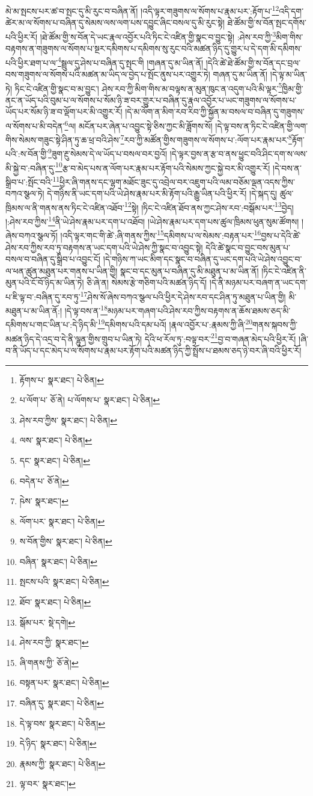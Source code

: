 མེ་མ་སྤངས་པར་ཚ་བ་སྤང་དུ་མི་རུང་བ་བཞིན་ནོ། །འདི་ལྟར་གཟུགས་ལ་སོགས་པ་རྣམ་པར་:རྟོག་པ་\footnote{རྟོགས་པ་  སྣར་ཐང་།  པེ་ཅིན། }\footnote{པ་ལོག་པ་  ཅོ་ནེ། པ་ལོགས་པ་  སྣར་ཐང་།  པེ་ཅིན། }འདི་དག་ཚེར་མ་ལ་སོགས་པ་བཞིན་དུ་སེམས་ལས་ལག་པས་དབྱུང་ཞིང་བསལ་དུ་མི་རུང་སྟེ། ཐེ་ཚོམ་གྱི་ས་བོན་སྤང་དགོས་པའི་ཕྱིར་རོ། །ཐེ་ཚོམ་གྱི་ས་བོན་དེ་ཡང་རྣལ་འབྱོར་པའི་ཏིང་ངེ་འཛིན་གྱི་སྣང་བ་བྱུང་སྟེ། :ཤེས་རབ་ཀྱི་\footnote{ཤེས་རབ་ཀྱིས་  སྣར་ཐང་།  པེ་ཅིན། }མིག་གིས་བརྟགས་ན་གཟུགས་ལ་སོགས་པ་སྔར་དམིགས་པ་དམིགས་སུ་རུང་བའི་མཚན་ཉིད་དུ་གྱུར་པ་དེ་དག་མི་དམིགས་པའི་ཕྱིར་ཐག་པ་ལ་\footnote{ལས་  སྣར་ཐང་།  པེ་ཅིན། }སྦྲུལ་དུ་ཤེས་པ་བཞིན་དུ་སྤང་གི །གཞན་དུ་མ་ཡིན་ནོ། །དེའི་ཚེ་ཐེ་ཚོམ་གྱི་ས་བོན་དང་བྲལ་བས་གཟུགས་ལ་སོགས་པའི་མཚན་མ་ཡིད་ལ་བྱེད་པ་སྤོང་ནུས་པར་འགྱུར་ཏེ། གཞན་དུ་མ་ཡིན་ནོ། །དེ་ལྟ་མ་ཡིན་ཏེ། ཏིང་ངེ་འཛིན་གྱི་སྣང་བ་མ་བྱུང་། ཤེས་རབ་ཀྱི་མིག་གིས་མ་བལྟས་ན་མུན་ཁུང་ན་འདུག་པའི་མི་ལྟར་\footnote{དང་  སྣར་ཐང་།  པེ་ཅིན། }ཁྱིམ་གྱི་ནང་ན་ཡོད་པའི་བུམ་པ་ལ་སོགས་པ་སོམ་ཉི་ཟ་བར་གྱུར་པ་བཞིན་དུ་རྣལ་འབྱོར་པ་ཡང་གཟུགས་ལ་སོགས་པ་ཡོད་པར་སོམ་ཉི་ཟ་བ་ལྡོག་པར་མི་འགྱུར་རོ། །དེ་མ་ལོག་ན་མིག་རབ་རིབ་ཀྱི་སྐྱོན་མ་བསལ་བ་བཞིན་དུ་གཟུགས་ལ་སོགས་པ་མི་བདེན་\footnote{བདེན་པ་  ཅོ་ནེ། }ལ། མངོན་པར་ཞེན་པ་འབྱུང་སྟེ་ཅིས་ཀྱང་མི་ཟློགས་སོ། །དེ་ལྟ་བས་ན་ཏིང་ངེ་འཛིན་གྱི་ལག་གིས་སེམས་གཟུང་སྟེ་ཤིན་ཏུ་ཆ་ཕྲ་བའི་ཤེས་\footnote{ཥེས་  སྣར་ཐང་། }རབ་ཀྱི་མཚོན་གྱིས་གཟུགས་ལ་སོགས་པ་:ལོག་པར་རྣམ་པར་\footnote{ལོག་པར་  སྣར་ཐང་།  པེ་ཅིན། }རྟོག་པའི་:ས་བོན་གྱི་\footnote{ས་བོན་གྱིས་  སྣར་ཐང་།  པེ་ཅིན། }ཟུག་རྔུ་སེམས་དེ་ལ་ཡོད་པ་བསལ་བར་བྱའོ། །དེ་ལྟར་བྱས་ན་རྩ་བ་ནས་ཕྱུང་བའི་ཤིང་དག་ས་ལས་མི་སྐྱེ་བ་:བཞིན་དུ་\footnote{བཞིན་  སྣར་ཐང་།  པེ་ཅིན། }རྩ་བ་མེད་པས་ན་ལོག་པར་རྣམ་པར་རྟོག་པའི་སེམས་ཀྱང་སྐྱེ་བར་མི་འགྱུར་རོ། །དེ་བས་ན་སྒྲིབ་པ་:སྤོང་བའི་\footnote{སྤངས་པའི་  སྣར་ཐང་།  པེ་ཅིན། }ཕྱིར་ཞི་གནས་དང་ལྷག་མཐོང་ཟུང་དུ་འབྲེལ་བར་འཇུག་པའི་ལམ་བཅོམ་ལྡན་འདས་ཀྱིས་བཀའ་སྩལ་ཏེ། དེ་གཉིས་ནི་ཡང་དག་པའི་ཡེ་ཤེས་རྣམ་པར་མི་རྟོག་པའི་རྒྱུ་ཡིན་པའི་ཕྱིར་རོ། །དེ་སྐད་དུ། ཚུལ་ཁྲིམས་ལ་ནི་གནས་ནས་ཏིང་ངེ་འཛིན་འཐོབ་\footnote{ཐོབ་  སྣར་ཐང་།  པེ་ཅིན། }སྟེ། །ཏིང་ངེ་འཛིན་ཐོབ་ནས་ཀྱང་ཤེས་རབ་:བསྒོམ་པར་\footnote{སྒོམ་པར་  སྡེ་དགེ། }བྱེད། །:ཤེས་རབ་ཀྱིས་\footnote{ཤེས་རབ་ཀྱི་  སྣར་ཐང་། }ནི་ཡེ་ཤེས་རྣམ་པར་དག་པ་འཐོབ། །ཡེ་ཤེས་རྣམ་པར་དག་པས་ཚུལ་ཁྲིམས་ཕུན་སུམ་ཚོགས། །ཞེས་བཀའ་སྩལ་ཏོ། །འདི་ལྟར་གང་གི་ཚེ་:ཞི་གནས་ཀྱིས་\footnote{ཞི་གནས་ཀྱི་  ཅོ་ནེ། }དམིགས་པ་ལ་སེམས་:བརྟན་པར་\footnote{བསྟན་པར་  སྣར་ཐང་།  པེ་ཅིན། }བྱས་པ་དེའི་ཚེ་ཤེས་རབ་ཀྱིས་རབ་ཏུ་བརྟགས་ན་ཡང་དག་པའི་ཡེ་ཤེས་ཀྱི་སྣང་བ་འབྱུང་སྟེ། དེའི་ཚེ་སྣང་བ་བྱུང་བས་མུན་པ་བསལ་བ་བཞིན་དུ་སྒྲིབ་པ་འབྱུང་ངོ། །དེ་གཉིས་ཀ་ཡང་མིག་དང་སྣང་བ་བཞིན་དུ་ཡང་དག་པའི་ཡེ་ཤེས་འབྱུང་བ་ལ་ཕན་ཚུན་མཐུན་པར་གནས་པ་ཡིན་གྱི། སྣང་བ་དང་མུན་པ་བཞིན་དུ་མི་མཐུན་པ་མ་ཡིན་ནོ། །ཏིང་ངེ་འཛིན་ནི་མུན་པའི་ངོ་བོ་ཉིད་མ་ཡིན་ཏེ། ཅི་ཞེ་ན། སེམས་རྩེ་གཅིག་པའི་མཚན་ཉིད་དོ། །དེ་ནི་མཉམ་པར་བཞག་ན་ཡང་དག་པ་ཇི་ལྟ་བ་:བཞིན་དུ་རབ་ཏུ་\footnote{བཞིན་དུ་  སྣར་ཐང་།  པེ་ཅིན། }ཤེས་སོ་ཞེས་བཀའ་སྩལ་པའི་ཕྱིར་དེ་ཤེས་རབ་དང་ཤིན་ཏུ་མཐུན་པ་ཡིན་གྱི། མི་མཐུན་པ་མ་ཡིན་ནོ:། །དེ་ལྟ་བས་ན་\footnote{དེ་ལྟ་བས་  སྣར་ཐང་།  པེ་ཅིན། }མཉམ་པར་གཞག་པའི་ཤེས་རབ་ཀྱིས་བརྟགས་ན་ཆོས་ཐམས་ཅད་མི་དམིགས་པ་གང་ཡིན་པ་:དེ་ཉིད་མི་\footnote{དེ་ཉིད་  སྣར་ཐང་།  པེ་ཅིན། }དམིགས་པའི་དམ་པའོ། །རྣལ་འབྱོར་པ་:རྣམས་ཀྱི་ཞི་\footnote{རྣམས་ཀྱི་  སྣར་ཐང་།  པེ་ཅིན། }གནས་སྐབས་ཀྱི་མཚན་ཉིད་དེ་འདྲ་བ་དེ་ནི་ལྷུན་གྱིས་གྲུབ་པ་ཡིན་ཏེ། དེའི་ཕ་རོལ་ཏུ་:བལྟ་བར་\footnote{ལྟ་བར་  སྣར་ཐང་། }བྱ་བ་གཞན་མེད་པའི་ཕྱིར་རོ། །ཞི་བ་ནི་ཡོད་པ་དང་མེད་པ་ལ་སོགས་པ་རྣམ་པར་རྟོག་པའི་མཚན་ཉིད་ཀྱི་སྤྲོས་པ་ཐམས་ཅད་ཉེ་བར་ཞི་བའི་ཕྱིར་རོ། 